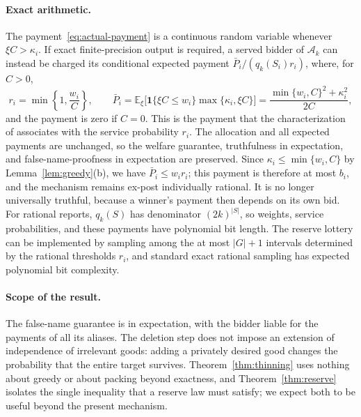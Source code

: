 \documentclass[format=acmsmall, review=false]{acmart}
\newcommand{\E}{\mathbb{E}}
\begin{document}
\paragraph{Exact arithmetic.}
The payment~\eqref{eq:actual-payment} is a continuous random
variable whenever \(\xi C>\kappa_i\). If exact finite-precision
output is required, a served bidder of \(\mathcal A_k\) can
instead be charged its conditional expected payment
\(\bar P_i/(q_k(S_i)r_i)\), where, for \(C>0\),
\begin{equation}\label{eq:retention-payment}
r_i=\min\left\{1,\frac{w_i}{C}\right\},
\qquad
\bar P_i
=\E_\xi\bigl[\mathbf{1}\{\xi C\le w_i\}\max\{\kappa_i,\xi C\}\bigr]
=\frac{\min\{w_i,C\}^2+\kappa_i^2}{2C},
\end{equation}
and the payment is zero if \(C=0\). This is the payment that the
characterization of \citet{myerson1981optimal} associates with
the service probability \(r_i\). The allocation and all expected
payments are unchanged, so the welfare guarantee, truthfulness
in expectation, and false-name-proofness in expectation are
preserved. Since \(\kappa_i\le\min\{w_i,C\}\) by
Lemma~\ref{lem:greedy}(b), we have \(\bar P_i\le w_ir_i\); this
payment is therefore at most \(b_i\), and the mechanism remains
ex-post individually rational. It is no longer universally
truthful, because a winner's payment then depends on its own
bid. For rational reports, \(q_k(S)\) has denominator
\((2k)^{|S|}\), so weights, service probabilities, and these
payments have polynomial bit length. The reserve lottery can be
implemented by sampling among the at most \(|G|+1\) intervals
determined by the rational thresholds \(r_i\), and standard
exact rational sampling has expected polynomial bit complexity.

\paragraph{Scope of the result.}
The false-name guarantee is in expectation, with the bidder
liable for the payments of all its aliases. The deletion step
does not impose an extension of independence of irrelevant
goods: adding a privately desired good changes the probability
that the entire target survives. Theorem~\ref{thm:thinning} uses
nothing about greedy or about packing beyond exactness, and
Theorem~\ref{thm:reserve} isolates the single inequality that a
reserve law must satisfy; we expect both to be useful beyond the
present mechanism.



\end{document}
